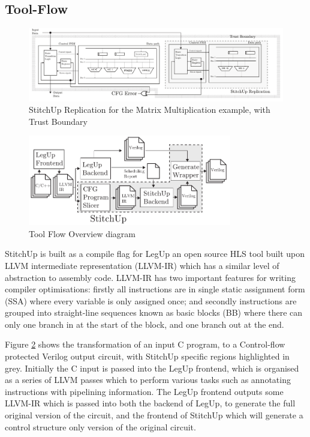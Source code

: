 
\subsection{Tool-Flow}


\begin{figure}[t]
\centering
\includegraphics[width=7in]{./imgs/HLSArch.pdf}
\caption{StitchUp Replication for the Matrix Multiplication example, with Trust Boundary}
\label{fig:HLSArch}
\end{figure}


\begin{figure}[h]
\centering
\includegraphics[width=3.5in]{./imgs/tool-flow.pdf}
\caption{Tool Flow Overview diagram}
\label{fig:tool_flow_diagram}
\end{figure}

StitchUp is built as a compile flag for LegUp an open source HLS tool built upon LLVM intermediate representation (LLVM-IR) which has
a similar level of abstraction to assembly code.
LLVM-IR has two important features for writing compiler optimisations:
firstly all instructions are in single static assignment form (SSA) where every variable is only
assigned once; and secondly instructions are grouped into straight-line sequences known as basic blocks (BB)
where there can only one branch in at the start of the block, and one branch out at the end.

Figure \ref{fig:tool_flow_diagram} shows the transformation of an input C program, to a Control-flow protected
Verilog output circuit, with StitchUp specific regions highlighted in grey.
Initially the C input is passed into the LegUp frontend, which is organised as a series of LLVM passes which
to perform various tasks such as annotating instructions with pipelining information.
The LegUp frontend outputs some LLVM-IR which is passed into both the backend of LegUp, to generate the full
original version of the circuit, and the frontend of StitchUp which will generate a control structure only version
of the original circuit.


